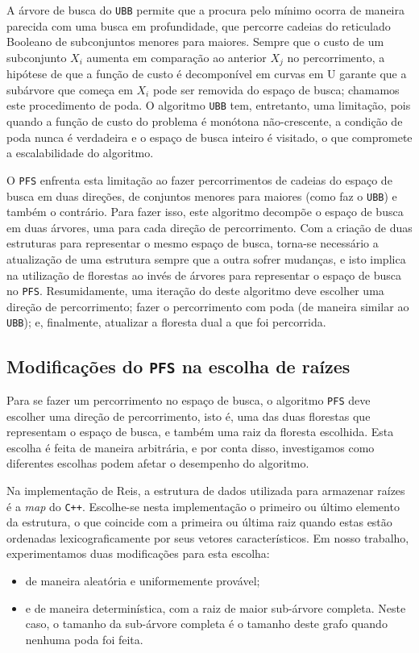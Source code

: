 \documentclass[12pt]{article}
\newcommand{\toolname}[1]{\textit{#1}}
\newcommand{\algname}[1]{\texttt{#1}}
\newcommand{\langname}[1]{\texttt{#1}}
\begin{document}
A árvore de busca do \algname{UBB} permite que a procura pelo mínimo 
ocorra de maneira parecida com uma busca em profundidade, que percorre
cadeias do reticulado Booleano de subconjuntos menores para maiores. 
Sempre que o custo de um subconjunto $X_i$ aumenta em comparação ao 
anterior $X_j$ no percorrimento, a hipótese de que a função de custo é 
decomponível em curvas em U garante que a subárvore que começa em $X_i$
pode ser removida do espaço de busca; chamamos este procedimento de
poda. O algoritmo \algname{UBB} tem, entretanto, uma limitação, pois
quando a função de custo do problema é monótona não-crescente, a 
condição de poda nunca é verdadeira e o espaço de busca inteiro é 
visitado, o que compromete a escalabilidade do algoritmo.

O \algname{PFS} enfrenta esta limitação ao fazer percorrimentos de
cadeias do espaço de busca em duas direções, de conjuntos menores para
maiores (como faz o \algname{UBB}) e também o contrário. Para fazer 
isso, este algoritmo decompõe o espaço de busca em duas árvores, uma 
para cada direção de percorrimento. Com a criação de duas estruturas 
para representar o mesmo espaço de busca, torna-se necessário a 
atualização de uma estrutura sempre que a outra sofrer mudanças, e isto
implica na utilização de florestas ao invés de árvores para representar
o espaço de busca no \algname{PFS}. Resumidamente, uma iteração do 
deste algoritmo deve escolher uma direção de percorrimento; fazer o 
percorrimento com poda (de maneira similar ao \algname{UBB}); e, 
finalmente, atualizar a floresta dual a que foi percorrida.


\subsection{Modificações do \algname{PFS} na escolha de raízes}
Para se fazer um percorrimento no espaço de busca, o algoritmo 
\algname{PFS} deve escolher uma direção de percorrimento, isto é, uma
das duas florestas que representam o espaço de busca, e também uma raiz
da floresta escolhida. Esta escolha é feita de maneira arbitrária, e por
conta disso, investigamos como diferentes escolhas podem afetar o 
desempenho do algoritmo.

Na implementação de Reis, a estrutura de dados utilizada para armazenar
raízes é a \toolname{map} do \langname{C++}. Escolhe-se nesta 
implementação o primeiro ou último elemento da estrutura, o que coincide
 com a primeira ou última raiz quando estas estão ordenadas 
lexicograficamente por seus vetores característicos. Em nosso trabalho, 
experimentamos duas modificações para esta escolha:
\begin{itemize}
    \item{de maneira aleatória e uniformemente provável;}
    \item{e de maneira determinística, com a raiz de maior sub-árvore
          completa. Neste caso, o tamanho da sub-árvore completa é o 
          tamanho deste grafo quando nenhuma poda foi feita.}
\end{itemize}
\end{document}
